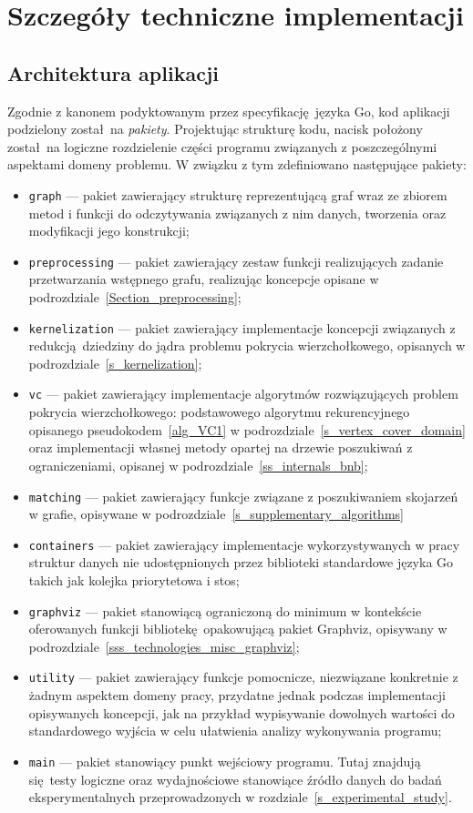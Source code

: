 \section{Szczegóły techniczne implementacji}\label{s_internals_implementation}
\subsection{Architektura aplikacji}\label{ss_internals_architecture}
\par{
  Zgodnie z kanonem podyktowanym przez specyfikację języka Go, kod aplikacji podzielony został na \emph{pakiety}.
  Projektując strukturę kodu, nacisk położony został na logiczne rozdzielenie części programu związanych z poszczególnymi aspektami domeny problemu.
  W związku z tym zdefiniowano następujące pakiety:
  \begin{itemize}
    \item \texttt{graph} --- pakiet zawierający strukturę reprezentującą graf wraz ze zbiorem metod i funkcji do odczytywania związanych z nim danych, tworzenia oraz modyfikacji jego konstrukcji;
    \item \texttt{preprocessing} --- pakiet zawierający zestaw funkcji realizujących zadanie przetwarzania wstępnego grafu, realizując koncepcje opisane w podrozdziale~\ref{Section_preprocessing};
    \item \texttt{kernelization} --- pakiet zawierający implementacje koncepcji związanych z redukcją dziedziny do jądra problemu pokrycia wierzchołkowego, opisanych w podrozdziale~\ref{s_kernelization};
    \item \texttt{vc} --- pakiet zawierający implementacje algorytmów rozwiązujących problem pokrycia wierzchołkowego: podstawowego algorytmu rekurencyjnego opisanego pseudokodem~\ref{alg_VC1} w podrozdziale~\ref{s_vertex_cover_domain} oraz implementacji własnej metody opartej na drzewie poszukiwań z ograniczeniami, opisanej w podrozdziale~\ref{ss_internals_bnb};
    \item \texttt{matching} --- pakiet zawierający funkcje związane z poszukiwaniem skojarzeń w grafie, opisywane w podrozdziale~\ref{s_supplementary_algorithms}
    \item \texttt{containers} --- pakiet zawierający implementacje wykorzystywanych w pracy struktur danych nie udostępnionych przez biblioteki standardowe języka Go takich jak kolejka priorytetowa i stos;
    \item \texttt{graphviz} --- pakiet stanowiącą ograniczoną do minimum w kontekście oferowanych funkcji bibliotekę opakowującą pakiet Graphviz, opisywany w podrozdziale~\ref{sss_technologies_misc_graphviz};
    \item \texttt{utility} --- pakiet zawierający funkcje pomocnicze, niezwiązane konkretnie z żadnym aspektem domeny pracy, przydatne jednak podczas implementacji opisywanych koncepcji, jak na przykład wypisywanie dowolnych wartości do standardowego wyjścia w celu ułatwienia analizy wykonywania programu;
    \item \texttt{main} --- pakiet stanowiący punkt wejściowy programu. Tutaj znajdują się testy logiczne oraz wydajnościowe stanowiące źródło danych do badań eksperymentalnych przeprowadzonych w rozdziale~\ref{s_experimental_study}.
  \end{itemize}
}
